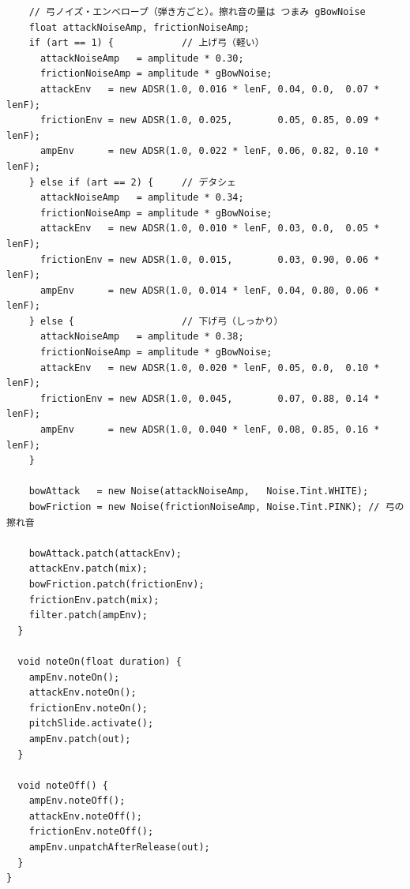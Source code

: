 \begin{lstlisting}
    // 弓ノイズ・エンベロープ（弾き方ごと）。擦れ音の量は つまみ gBowNoise
    float attackNoiseAmp, frictionNoiseAmp;
    if (art == 1) {            // 上げ弓（軽い）
      attackNoiseAmp   = amplitude * 0.30;
      frictionNoiseAmp = amplitude * gBowNoise;
      attackEnv   = new ADSR(1.0, 0.016 * lenF, 0.04, 0.0,  0.07 * lenF);
      frictionEnv = new ADSR(1.0, 0.025,        0.05, 0.85, 0.09 * lenF);
      ampEnv      = new ADSR(1.0, 0.022 * lenF, 0.06, 0.82, 0.10 * lenF);
    } else if (art == 2) {     // デタシェ
      attackNoiseAmp   = amplitude * 0.34;
      frictionNoiseAmp = amplitude * gBowNoise;
      attackEnv   = new ADSR(1.0, 0.010 * lenF, 0.03, 0.0,  0.05 * lenF);
      frictionEnv = new ADSR(1.0, 0.015,        0.03, 0.90, 0.06 * lenF);
      ampEnv      = new ADSR(1.0, 0.014 * lenF, 0.04, 0.80, 0.06 * lenF);
    } else {                   // 下げ弓（しっかり）
      attackNoiseAmp   = amplitude * 0.38;
      frictionNoiseAmp = amplitude * gBowNoise;
      attackEnv   = new ADSR(1.0, 0.020 * lenF, 0.05, 0.0,  0.10 * lenF);
      frictionEnv = new ADSR(1.0, 0.045,        0.07, 0.88, 0.14 * lenF);
      ampEnv      = new ADSR(1.0, 0.040 * lenF, 0.08, 0.85, 0.16 * lenF);
    }

    bowAttack   = new Noise(attackNoiseAmp,   Noise.Tint.WHITE);
    bowFriction = new Noise(frictionNoiseAmp, Noise.Tint.PINK); // 弓の擦れ音

    bowAttack.patch(attackEnv);
    attackEnv.patch(mix);
    bowFriction.patch(frictionEnv);
    frictionEnv.patch(mix);
    filter.patch(ampEnv);
  }

  void noteOn(float duration) {
    ampEnv.noteOn();
    attackEnv.noteOn();
    frictionEnv.noteOn();
    pitchSlide.activate();
    ampEnv.patch(out);
  }

  void noteOff() {
    ampEnv.noteOff();
    attackEnv.noteOff();
    frictionEnv.noteOff();
    ampEnv.unpatchAfterRelease(out);
  }
}
\end{lstlisting}